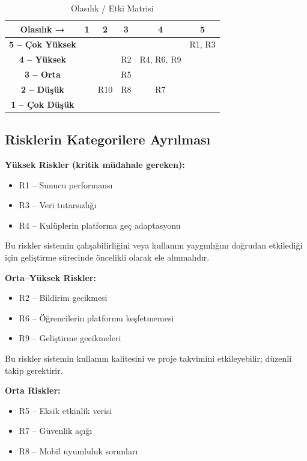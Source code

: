 \documentclass[a4paper,12pt]{report}
\begin{document}
\begin{table}[H]
\centering
\caption{Olasılık / Etki Matrisi}
\begin{tabular}{c c c c c c}
\toprule
\textbf{Olasılık →} & \textbf{1} & \textbf{2} & \textbf{3} & \textbf{4} & \textbf{5} \\
\midrule
\textbf{5 – Çok Yüksek} &  &  &  &  & R1, R3 \\
\textbf{4 – Yüksek} &  &  & R2 & R4, R6, R9 &  \\
\textbf{3 – Orta} &  &  & R5 &  &  \\
\textbf{2 – Düşük} &  & R10 & R8 & R7 &  \\
\textbf{1 – Çok Düşük} &  &  &  &  &  \\
\bottomrule
\end{tabular}
\end{table}

\subsection{Risklerin Kategorilere Ayrılması}

\textbf{Yüksek Riskler (kritik müdahale gereken):}
\begin{itemize}
    \item R1 – Sunucu performansı
    \item R3 – Veri tutarsızlığı
    \item R4 – Kulüplerin platforma geç adaptasyonu
\end{itemize}

Bu riskler sistemin çalışabilirliğini veya kullanım yaygınlığını doğrudan etkilediği için geliştirme sürecinde öncelikli olarak ele alınmalıdır.

\textbf{Orta–Yüksek Riskler:}
\begin{itemize}
    \item R2 – Bildirim gecikmesi
    \item R6 – Öğrencilerin platformu keşfetmemesi
    \item R9 – Geliştirme gecikmeleri
\end{itemize}

Bu riskler sistemin kullanım kalitesini ve proje takvimini etkileyebilir; düzenli takip gerektirir.

\textbf{Orta Riskler:}
\begin{itemize}
    \item R5 – Eksik etkinlik verisi
    \item R7 – Güvenlik açığı
    \item R8 – Mobil uyumluluk sorunları
\end{itemize}
\end{document}
